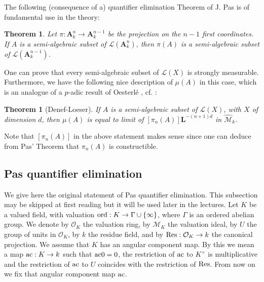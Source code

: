\documentclass[english,12pt]{amsart}
\def\ac{{\rm ac}}
\def\AA{{\mathbf A}}
\def\LL{{\mathbf L}}
\def\cL{{\mathcal L}}
\def\cM{{\mathcal M}}
\def\cO{{\mathcal O}}
\newtheorem{theorem}[subsubsection]{Theorem}
\theoremstyle{definition}
\theoremstyle{remark}
\theoremstyle{plain}
\numberwithin{equation}{subsection}
\def\AA{{\mathbf A}}
\def\LL{{\mathbf L}}
\def\cL{{\mathcal L}}
\def\cM{{\mathcal M}}
\def\cO{{\mathcal O}}
\begin{document}
The following (consequence of a) quantifier elimination Theorem
of J. Pas \cite{Pas} is of fundamental use 
in the theory:


\begin{theorem}\label{Pas}Let $\pi : \AA_k^n
\rightarrow \AA^{n - 1}_k$ be the projection on the $n - 1$ first coordinates.
If $A$ is a semi-algebraic subset of
$\cL (\AA_k^n)$, then $\pi (A)$ is a 
semi-algebraic subset of
$\cL (\AA_k^{n - 1})$. 
\end{theorem}




One can prove that every semi-algebraic subset of $\cL (X)$
is strongly measurable. Furthermore, we have the following nice
description
of $\mu (A)$ in this case, which is an analogue of a $p$-adic result of
Oesterl\'e \cite{jo}, cf. \cite{inv}:

\begin{theorem}[Denef-Loeser]\label{mo}If $A$ is a semi-algebraic subset of $\cL (X)$,
with $X$ of dimension $d$,
then $\mu (A)$ is equal to limit of
$[\pi_n (A)] \LL^{- (n+ 1) d} $ in $\widehat \cM_k$.
\end{theorem}

Note that $[\pi_n (A)]$ in the above statement makes sense since
one can deduce from Pas' Theorem that
$\pi_n (A)$ is constructible.


\subsection{Pas quantifier elimination}\label{uuu}We give here the original statement
of Pas quantifier elimination. This subsection may be skipped at first reading
but it  will be used
later in the lectures.
Let $K$ be a valued field, with valuation
${\rm ord} : K \rightarrow \Gamma \cup \{\infty \}$,
where $\Gamma$ is an ordered abelian group.
We denote by $\cO_{K}$ the valuation ring, by $\cM_K$ the valuation ideal,
by $U$ the group of units in $\cO_{K}$, by $k$ the residue field, 
and by ${\rm Res} : \cO_{K} \rightarrow k$ the canonical projection.
We assume that $K$ has an angular component map.
By this we mean a map $\ac :
K \rightarrow k$ such that
$\ac 0 = 0$, the restriction of $\ac$ to
$K^{\times}$ is multiplicative and 
the restriction of $\ac$ to $U$
coincides with the restriction of ${\rm Res}$.
From now on we fix that angular component map
$\ac$.
\end{document}
